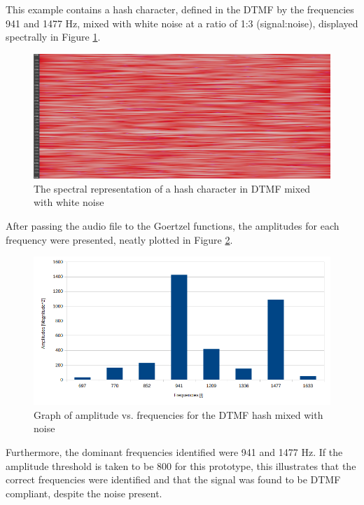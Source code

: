 \documentclass{cce2014-design}
\begin{document}
{		This example contains a hash character, defined in the DTMF by the frequencies 941 and 1477 Hz, mixed with white noise at a ratio of 1:3 (signal:noise), displayed spectrally in Figure \ref{subsub:gtzl-eg-hash-spectrum}.
		\begin{figure}[H]
			\centering
			\includegraphics[width=\linewidth]{hashDTMF-75N25S-8000FS-spectrum.png}
			\caption{The spectral representation of a hash character in DTMF mixed with white noise}
			\label{subsub:gtzl-eg-hash-spectrum}
		\end{figure}

		After passing the audio file to the Goertzel functions, the amplitudes for each frequency were presented, neatly plotted in Figure \ref{subsub:gtzl-eg-hash-chart}.
		\begin{figure}[H]
			\centering
			\includegraphics[width=\linewidth]{hashDTMF-75N25S-8000FS-chart.png}
			\caption{Graph of amplitude vs. frequencies for the DTMF hash mixed with noise}
			\label{subsub:gtzl-eg-hash-chart}
		\end{figure}
		Furthermore, the dominant frequencies identified were 941 and 1477 Hz.
		If the amplitude threshold is taken to be 800 for this prototype, this illustrates that the correct frequencies were identified and that the signal was found to be DTMF compliant, despite the noise present.

}
\end{document}

